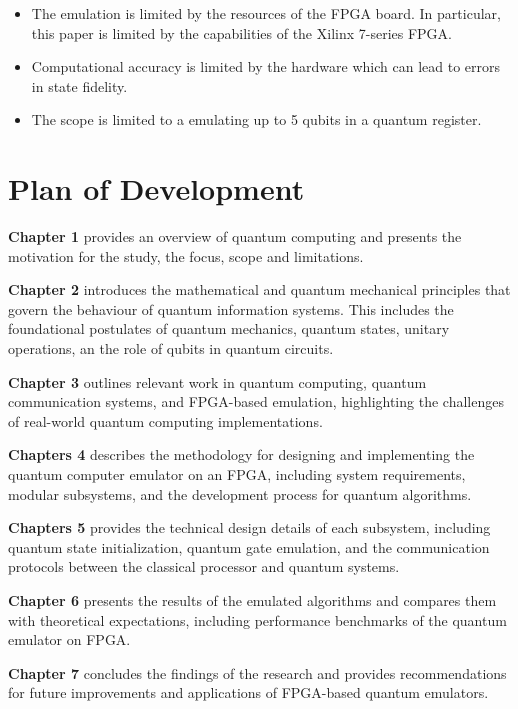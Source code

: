 \begin{itemize}
	\item 
	The emulation is limited by the resources of the FPGA board. In particular, this paper is limited by the capabilities of the Xilinx 7-series FPGA.
	\item 
	Computational accuracy is limited by the hardware which can lead to errors in state fidelity.
	\item 
	The scope is limited to a emulating up to 5 qubits in a quantum register.
\end{itemize}

\section{Plan of Development}

\textbf{Chapter 1} provides an overview of quantum computing and presents the motivation for the study, the focus, scope and limitations.

\textbf{Chapter 2} introduces the mathematical and quantum mechanical principles that govern the behaviour of quantum information systems.  This includes the foundational postulates of quantum mechanics, quantum states, unitary operations, an the role of qubits in quantum circuits.

\textbf{Chapter 3} outlines relevant work in quantum computing, quantum communication systems, and FPGA-based emulation, highlighting the challenges of real-world quantum computing implementations.

\textbf{Chapters 4} describes the methodology for designing and implementing the quantum computer emulator on an FPGA, including system requirements, modular subsystems, and the development process for quantum algorithms.

\textbf{Chapters 5} provides the technical design details of each subsystem, including quantum state initialization, quantum gate emulation, and the communication protocols between the classical processor and quantum systems.

\textbf{Chapter 6} presents the results of the emulated algorithms and compares them with theoretical expectations, including performance benchmarks of the quantum emulator on FPGA.

\textbf{Chapter 7} concludes the findings of the research and provides recommendations for future improvements and applications of FPGA-based quantum emulators.
